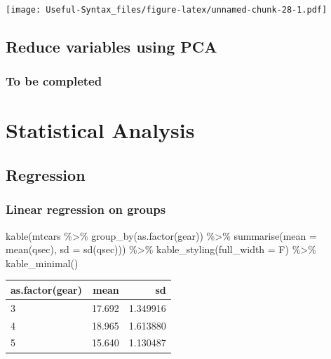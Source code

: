 \documentclass[
]{book}
\newenvironment{Shaded}{\begin{snugshade}}{\end{snugshade}}
\newcommand{\AttributeTok}[1]{\textcolor[rgb]{0.77,0.63,0.00}{#1}}
\newcommand{\FunctionTok}[1]{\textcolor[rgb]{0.00,0.00,0.00}{#1}}
\newcommand{\NormalTok}[1]{#1}
\newcommand{\SpecialCharTok}[1]{\textcolor[rgb]{0.00,0.00,0.00}{#1}}
\begin{document}
\texttt{[image: Useful-Syntax\_files/figure-latex/unnamed-chunk-28-1.pdf]}

\hypertarget{reduce-variables-using-pca}{%
\section{Reduce variables using PCA}\label{reduce-variables-using-pca}}

\hypertarget{to-be-completed}{%
\subsection{To be completed}\label{to-be-completed}}

\hypertarget{statistical-analysis}{%
\chapter{Statistical Analysis}\label{statistical-analysis}}

\hypertarget{regression}{%
\section{Regression}\label{regression}}

\hypertarget{linear-regression-on-groups}{%
\subsection{Linear regression on groups}\label{linear-regression-on-groups}}

\begin{Shaded}
\begin{Highlighting}[]
\FunctionTok{kable}\NormalTok{(mtcars }\SpecialCharTok{\%\textgreater{}\%}  \FunctionTok{group\_by}\NormalTok{(}\FunctionTok{as.factor}\NormalTok{(gear)) }\SpecialCharTok{\%\textgreater{}\%}
\FunctionTok{summarise}\NormalTok{(}\AttributeTok{mean =} \FunctionTok{mean}\NormalTok{(qsec), }\AttributeTok{sd =} \FunctionTok{sd}\NormalTok{(qsec))) }\SpecialCharTok{\%\textgreater{}\%}
  \FunctionTok{kable\_styling}\NormalTok{(}\AttributeTok{full\_width =}\NormalTok{ F) }\SpecialCharTok{\%\textgreater{}\%}
  \FunctionTok{kable\_minimal}\NormalTok{()}
\end{Highlighting}
\end{Shaded}

\begin{table}
\centering
\begin{tabular}{l|r|r}
\hline
as.factor(gear) & mean & sd\\
\hline
3 & 17.692 & 1.349916\\
\hline
4 & 18.965 & 1.613880\\
\hline
5 & 15.640 & 1.130487\\
\hline
\end{tabular}
\end{table}
\end{document}
